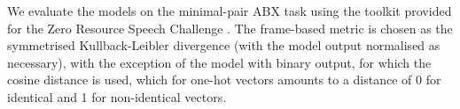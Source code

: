 We evaluate the models on the minimal-pair ABX task \parencite{schatz2013evaluating} using the toolkit provided for the Zero Resource Speech Challenge \parencite{versteegh2015zero}.
The frame-based metric is chosen as the symmetrised Kullback-Leibler divergence (with the model output normalised as necessary), with the exception of the model with binary output, for which the cosine distance is used, which for one-hot vectors amounts to a distance of 0 for identical and 1 for non-identical vectors.

